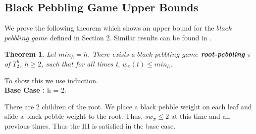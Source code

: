 \documentclass[12pt]{article}
\newtheorem{theorem}{Theorem}[subsection]
\begin{document}
\subsection{Black Pebbling Game Upper Bounds} 

We prove the following theorem which shows an upper bound for the $black$ $pebbling$ $game$ defined in Section 2. Similar results can be found in \cite{c:pebjournal}.

\begin{theorem}
Let $min_h = h$.
There exists a $black$ $pebbling$ $game$ {\bf root-pebbling} $\pi$ of $T^h_2$, $h \geq 2$, such
that for all times t, $w_\pi(t) \le min_h$.
\end{theorem}

\noindent
To show this we use induction.\\



\noindent
{\bf Base Case :} h = 2.

There are 2 children of the root. We place a black pebble weight on each leaf and slide a black pebble weight to the root. Thus, $sw_\pi \leq 2$ at this time and all previous times. Thus the IH is satisfied in the base case.\\





\end{document}
